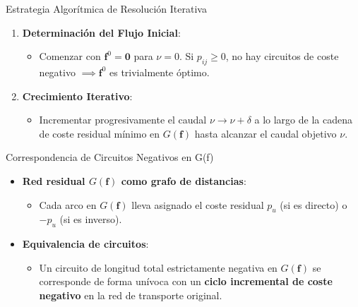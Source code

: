\documentclass[
  ignorenonframetext,
]{beamer}
\providecommand{\tightlist}{%
  \setlength{\itemsep}{0pt}\setlength{\parskip}{0pt}}
\begin{document}
\begin{frame}{Estrategia Algorítmica de Resolución Iterativa}
\label{estrategia-algoruxedtmica-de-resoluciuxf3n-iterativa}
\begin{tcolorbox}[enhanced jigsaw, opacityback=0, breakable, title=\textcolor{quarto-callout-note-color}{\faInfo}\hspace{0.5em}{Estrategia algorítmica de resolución iterativa}, colback=white, colbacktitle=quarto-callout-note-color!10!white, bottomrule=.15mm, opacitybacktitle=0.6, coltitle=black, bottomtitle=1mm, leftrule=.75mm, colframe=quarto-callout-note-color-frame, toptitle=1mm, titlerule=0mm, rightrule=.15mm, left=2mm, arc=.35mm, toprule=.15mm]

\begin{enumerate}
\tightlist
\item
  \textbf{Determinación del Flujo Inicial}:

  \begin{itemize}
  \tightlist
  \item
    Comenzar con \(\mathbf{f}^0 = \mathbf{0}\) para \(\nu = 0\). Si
    \(p_{ij} \ge 0\), no hay circuitos de coste negativo
    \(\implies \mathbf{f}^0\) es trivialmente óptimo.
  \end{itemize}
\item
  \textbf{Crecimiento Iterativo}:

  \begin{itemize}
  \tightlist
  \item
    Incrementar progresivamente el caudal \(\nu \to \nu + \delta\) a lo
    largo de la cadena de coste residual mínimo en \(G(\mathbf{f})\)
    hasta alcanzar el caudal objetivo \(\nu\).
  \end{itemize}
\end{enumerate}

\end{tcolorbox}
\end{frame}

\begin{frame}{Correspondencia de Circuitos Negativos en G(f)}
\label{correspondencia-de-circuitos-negativos-en-gf}
\begin{itemize}
\tightlist
\item
  \textbf{Red residual \(G(\mathbf{f})\) como grafo de distancias}:

  \begin{itemize}
  \tightlist
  \item
    Cada arco en \(G(\mathbf{f})\) lleva asignado el coste residual
    \(p_u\) (si es directo) o \(-p_u\) (si es inverso).
  \end{itemize}
\item
  \textbf{Equivalencia de circuitos}:

  \begin{itemize}
  \tightlist
  \item
    Un circuito de longitud total estrictamente negativa en
    \(G(\mathbf{f})\) se corresponde de forma unívoca con un
    \textbf{ciclo incremental de coste negativo} en la red de transporte
    original.
  \end{itemize}
\end{itemize}
\end{frame}
\end{document}
